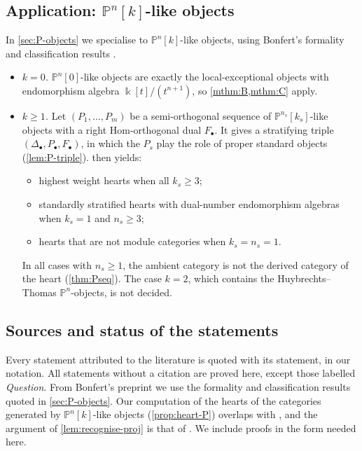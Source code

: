 \documentclass[11pt,reqno]{amsart}
\theoremstyle{plain}
\theoremstyle{definition}
\theoremstyle{remark}
\newcommand{\kk}{\Bbbk}
\newcommand{\Pn}[2]{\mathbb{P}^{#1}[#2]}
\begin{document}
\subsection{Application: \texorpdfstring{$\mathbb{P}^n[k]$}{Pn[k]}-like objects}
In \cref{sec:P-objects} we specialise to $\Pn nk$-like objects, using Bonfert's formality and classification results \cite{Bonf26}.
\begin{itemize}
\item \emph{$k=0$.} $\Pn n0$-like objects are exactly the local-exceptional objects with endomorphism algebra $\kk[t]/(t^{n+1})$, so \cref{mthm:B,mthm:C} apply.
\item \emph{$k\ge1$.} Let $(P_1,\dots,P_m)$ be a semi-orthogonal sequence of $\Pn{n_s}{k_s}$-like objects with a right Hom-orthogonal dual $F_\bullet$. It gives a stratifying triple $(\Delta_\bullet,P_\bullet,F_\bullet)$, in which the $P_s$ play the role of proper standard objects (\cref{lem:P-triple}).  then yields:
\begin{itemize}
\item highest weight hearts when all $k_s\ge3$;
\item standardly stratified hearts with dual-number endomorphism algebras when $k_s=1$ and $n_s\ge3$;
\item hearts that are not module categories when $k_s=n_s=1$.
\end{itemize}
In all cases with $n_s\ge1$, the ambient category is not the derived category of the heart (\cref{thm:Pseq}). The case $k=2$, which contains the Huybrechts--Thomas $\mathbb{P}^n$-objects, is not decided.
\end{itemize}

\subsection*{Sources and status of the statements}
Every statement attributed to the literature is quoted with its statement, in our notation. All statements without a citation are proved here, except those labelled \emph{Question}. From Bonfert's preprint \cite{Bonf26} we use the formality and classification results quoted in \cref{sec:P-objects}. Our computation of the hearts of the categories generated by $\Pn nk$-like objects (\cref{prop:heart-P}) overlaps with \cite[Lemmas~3.11 and~4.15]{Bonf26}, and the argument of \cref{lem:recognise-proj} is that of \cite[Lemma~3.12]{Bonf26}. We include proofs in the form needed here.
\end{document}
